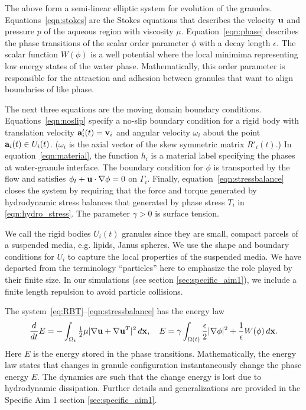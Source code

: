 The above form a semi-linear elliptic 
system for evolution of the granules.  Equations~\eqref{eqn:stokes} are the
Stokes equations that describes the velocity $\uu$ and pressure $p$ of
the aqueous region with viscosity $\mu$.  Equation~\eqref{eqn:phase} describes the
phase transitions of the scalar order parameter $\phi$ with a decay
length $\epsilon$.
The scalar function $W(\phi)$ is a well potential where the local 
minimima representing low energy states of the water phase.
Mathematically, this order parameter is responsible for
the attraction and adhesion between granules that want to align boundaries
of like phase.

The next three equations are the moving domain boundary conditions.
Equations~\eqref{eqn:noslip} specify a no-slip
boundary condition for a rigid body with translation velocity $\aa'_i(t) = \vv_i$
and angular velocity $\omega_i$
about the point $\aa_i(t) \in U_i(t)$.
($\omega_i$ is the axial vector of the
skew symmetric matrix $R'_i(t)$.)
In
equation~\eqref{eqn:material}, the function $h_i$ is a material label
specifying the phases at water-granule interface.
The boundary condition for $\phi$ is transported by the flow
and satisfies $\phi_t + \uu \cdot \nabla \phi = 0$ on $\Gamma_i$.
Finally,
equation~\eqref{eqn:stressbalance} closes the system by
requiring that the force and torque generated by 
hydrodynamic stress balances that generated by phase stress $T_i$ in
\eqref{eqn:hydro_stress}.
The parameter $\gamma > 0$ is surface tension. 

We call the rigid bodies $U_i(t)$ granules since they are small, compact
parcels of a suspended media, e.g. lipids, Janus spheres.
We use the shape and boundary conditions for $U_i$ to capture the local
properties of the suspended media. 
We have departed from the terminology ``particles'' here
to emphasize the role played by their finite size. 
In our simulations (see section \ref{sec:specific_aim1}),
we include a finite length repulsion to avoid particle
collisions.




The system~\eqref{eq:RBT}--\eqref{eqn:stressbalance}
has the energy law
\begin{equation}
\label{eq:energy_law}
  \frac{d}{dt}E
  = - \int_{\Omega_t}\tfrac{1}{2}\mu|\nabla \uu + \nabla
  \uu^T|^2 \,d\xx,\quad
    E = \gamma \int_{\Omega(t)}
  \frac{\epsilon}{2} |\nabla \phi|^2 + \frac{1}{\epsilon} W(\phi) \,d\xx.
\end{equation}
Here $E$ is the energy stored in the phase transitions.
Mathematically, the energy law states that changes
in granule configuration instantaneously change the phase energy $E$.
The dynamics are such that the change energy
is lost due to hydrodynamic dissipation.
Further details and generalizations are provided in
the Specific Aim 1 section \ref{sec:specific_aim1}.

